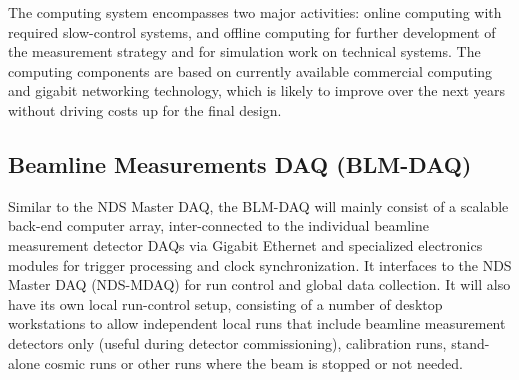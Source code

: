 The computing system encompasses two major activities: online computing with required 
slow-control systems, and offline computing for further development of the measurement 
strategy and for simulation work on technical systems. The computing components are based 
on currently available commercial computing and gigabit networking technology, which is 
likely to improve over the next years without driving costs up for the final design.  

\subsection{Beamline Measurements DAQ (BLM-DAQ)}

Similar to the NDS Master DAQ, the BLM-DAQ will mainly consist of a scalable back-end 
computer array, inter-connected to the individual beamline measurement detector DAQs via 
Gigabit Ethernet and specialized electronics modules for trigger processing and clock 
synchronization. It interfaces to the NDS Master DAQ (NDS-MDAQ) for run control and global 
data collection. It will also have its own local run-control setup, consisting of a number 
of desktop workstations to allow independent local runs that include beamline measurement 
detectors only (useful during detector commissioning), calibration runs, stand-alone cosmic 
runs or other runs where the beam is stopped or not needed.

